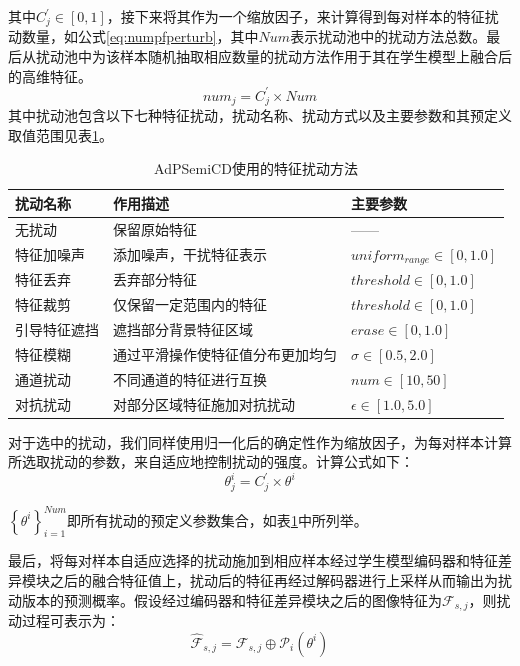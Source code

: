 \documentclass[lang=chs, degree=master, blindreview=false, adobe=false]{yanputhesis}
\begin{document}
其中$C_j^{\prime} \in [0,1]$，接下来将其作为一个缩放因子，来计算得到每对样本的特征扰动数量，如公式\ref{eq:numpfperturb}，其中$Num$表示扰动池中的扰动方法总数。最后从扰动池中为该样本随机抽取相应数量的扰动方法作用于其在学生模型上融合后的高维特征。
\begin{equation}
  \label{eq:numpfperturb}
  num_j=C_j^{\prime} \times Num
\end{equation}
其中扰动池包含以下七种特征扰动，扰动名称、扰动方式以及主要参数和其预定义取值范围见表\ref{tab:feature_perturb}。
\begin{table}[h!]
  \centering
  \caption{AdPSemiCD使用的特征扰动方法}
  \begin{tabular}{@{}lp{8cm}l@{}}
  \toprule
  \textbf{扰动名称} & \textbf{作用描述} & \textbf{主要参数}\\ \midrule
  无扰动 & 保留原始特征 & ——\\
  特征加噪声 & 添加噪声，干扰特征表示 & $uniform_{range} \in [0, 1.0]$\\
  特征丢弃 & 丢弃部分特征 & $ threshold \in [0, 1.0]$\\
  特征裁剪 & 仅保留一定范围内的特征 & $ threshold \in [0, 1.0]$\\
  引导特征遮挡 & 遮挡部分背景特征区域 & $ erase \in [0, 1.0]$ \\
  特征模糊 & 通过平滑操作使特征值分布更加均匀 & $ \sigma \in [0.5, 2.0]$ \\
  通道扰动 & 不同通道的特征进行互换 & $ num \in [10, 50]$ \\
  对抗扰动 & 对部分区域特征施加对抗扰动 & $ \epsilon \in [1.0, 5.0]$ \\
  \bottomrule
  \end{tabular}
  \label{tab:feature_perturb}
\end{table}

对于选中的扰动，我们同样使用归一化后的确定性作为缩放因子，为每对样本计算所选取扰动的参数，来自适应地控制扰动的强度。计算公式如下：
\begin{equation}
  \label{eq:parmpfperturb}
  \theta_j^i=C_j^{\prime} \times \theta^i
\end{equation}

$\left \{{\theta^i}\right \}_{i=1}^{Num}$即所有扰动的预定义参数集合，如表\ref{tab:feature_perturb}中所列举。

最后，将每对样本自适应选择的扰动施加到相应样本经过学生模型编码器和特征差异模块之后的融合特征值上，扰动后的特征再经过解码器进行上采样从而输出为扰动版本的预测概率。假设经过编码器和特征差异模块之后的图像特征为${\mathcal{F}}_{s,j}$，则扰动过程可表示为：
\begin{equation}
  \label{eq:perturb-process}
  {\hat{\mathcal{F}}}_{s,j} = {\mathcal{F}}_{s,j} \oplus {\mathcal{P}}_i(\theta^i)
\end{equation}
\end{document}
